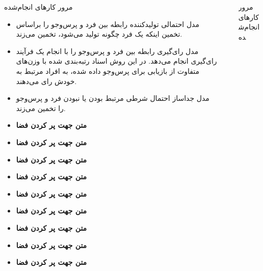 \documentclass[final,hyperref={pdfpagelabels=false}]{beamer}
\begin{document}
\begin{frame}[t]
\begin{columns}[t]
\begin{column}{.465\textwidth}
\begin{block}{مرور کار‌های انجام‌شده}
\begin{itemize}
\item
مدل احتمالی تولیدکننده رابطه بین فرد و پرس‌و‌جو را براساس تخمین اینکه یک فرد چگونه تولید می‌شود، تخمین می‌زند.




\item 
مدل رای‌گیری رابطه بین فرد و پرس‌و‌جو را با انجام یک فرآیند رای‌گیری انجام می‌دهد. در این روش اسناد رتبه‌بندی شده با وزن‌های متفاوت از بازیابی برای پرس‌و‌جو داده شده، به افراد مرتبط به خودش رای می‌دهند.

\item مدل جداساز احتمال شرطی مرتبط بودن یا نبودن فرد و پرس‌و‌جو را تخمین می‌زند.

\item {\textbf{متن جهت پر کردن فضا}}
\item {\textbf{متن جهت پر کردن فضا}}
\item {\textbf{متن جهت پر کردن فضا}}
\item {\textbf{متن جهت پر کردن فضا}}
\item {\textbf{متن جهت پر کردن فضا}}
\item {\textbf{متن جهت پر کردن فضا}}
\item {\textbf{متن جهت پر کردن فضا}}
\item {\textbf{متن جهت پر کردن فضا}}
\item {\textbf{متن جهت پر کردن فضا}}

\end{itemize}

\end{block}


\end{column} %
\begin{column}{.03\textwidth}\end{column} %
 
\begin{column}{.465\textwidth} %

\begin{block}{مرور کار‌های انجام‌شده}
\begin{itemize}



\end{itemize}
\end{block}
\end{column}
\end{columns}
\end{frame}
\end{document}
